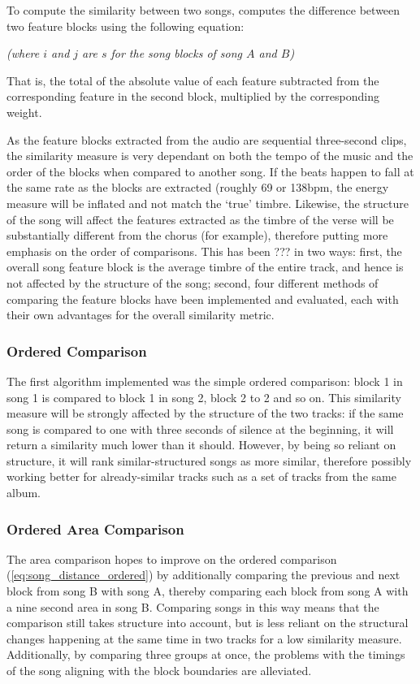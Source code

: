 To compute the similarity between two songs,  computes the difference between two feature blocks using the following equation:

\begin{center}
	\small \textit{(where $i$ and $j$ are $s$ for the song blocks of song $A$ and $B$)}
\end{center}
That is, the total of the absolute value of each feature subtracted from the corresponding feature in the second block, multiplied by the corresponding weight.

As the feature blocks extracted from the audio are sequential three-second clips, the similarity measure is very dependant on both the tempo of the music and the order of the blocks when compared to another song. If the beats happen to fall at the same rate as the blocks are extracted (roughly 69 or 138bpm, the energy measure will be inflated and not match the `true' timbre. Likewise, the structure of the song will affect the features extracted as the timbre of the verse will be substantially different from the chorus (for example), therefore putting more emphasis on the order of comparisons. This has been ??? in two ways: first, the overall song feature block is the average timbre of the entire track, and hence is not affected by the structure of the song; second, four different methods of comparing the feature blocks have been implemented and evaluated, each with their own advantages for the overall similarity metric.

\subsubsection{Ordered Comparison}

The first algorithm implemented was the simple ordered comparison: block 1 in song 1 is compared to block 1 in song 2, block 2 to 2 and so on. This similarity measure will be strongly affected by the structure of the two tracks: if the same song is compared to one with three seconds of silence at the beginning, it will return a similarity much lower than it should. However, by being so reliant on structure, it will rank similar-structured songs as more similar, therefore possibly working better for already-similar tracks such as a set of tracks from the same album.
\subsubsection{Ordered Area Comparison}

The area comparison hopes to improve on the ordered comparison (\ref{eq:song_distance_ordered}) by additionally comparing the previous and next block from song B with song A, thereby comparing each block from song A with a nine second area in song B. Comparing songs in this way means that the comparison still takes structure into account, but is less reliant on the structural changes happening at the same time in two tracks for a low similarity measure. Additionally, by comparing three groups at once, the problems with the timings of the song aligning with the block boundaries are alleviated.
